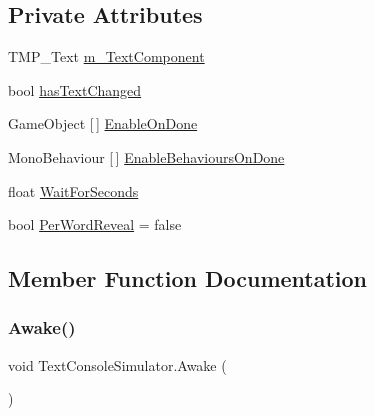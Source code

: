 \subsection*{Private Attributes}
\begin{DoxyCompactItemize}
\item 
T\+M\+P\+\_\+\+Text \mbox{\hyperlink{class_text_console_simulator_a9476154b492624b397edc6bc485a87d2}{m\+\_\+\+Text\+Component}}
\item 
bool \mbox{\hyperlink{class_text_console_simulator_a6f07f0cdd32558344f8897fa322f9458}{has\+Text\+Changed}}
\item 
Game\+Object \mbox{[}$\,$\mbox{]} \mbox{\hyperlink{class_text_console_simulator_acb70fff73a84c2644f09acacd52a1d95}{Enable\+On\+Done}}
\item 
Mono\+Behaviour \mbox{[}$\,$\mbox{]} \mbox{\hyperlink{class_text_console_simulator_a3ac15161fc7820a923b0ca7c11b0d549}{Enable\+Behaviours\+On\+Done}}
\item 
float \mbox{\hyperlink{class_text_console_simulator_ac13624a34ec39672645dbf9a090e8e4d}{Wait\+For\+Seconds}}
\item 
bool \mbox{\hyperlink{class_text_console_simulator_a9987d72c0306d133dd93df659ba654bf}{Per\+Word\+Reveal}} = false
\end{DoxyCompactItemize}


\subsection{Member Function Documentation}
\mbox{\label{class_text_console_simulator_aa4d09e387a08d3301c3997762bd9536d}} 
\subsubsection{\texorpdfstring{Awake()}{Awake()}}
{\footnotesize\ttfamily void Text\+Console\+Simulator.\+Awake (\begin{DoxyParamCaption}{ }\end{DoxyParamCaption})\hspace{0.3cm}{\ttfamily [private]}}

\mbox{\label{class_text_console_simulator_a00f1a84f3b64fdc61d2b5dc4ec22b8b5}} 
